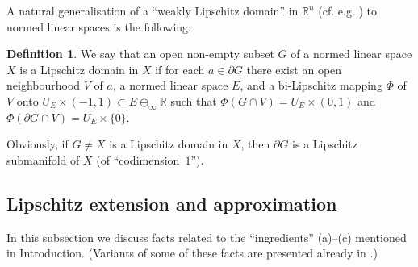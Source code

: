 \documentclass[a4paper,twoside,10pt,reqno,draft]{amsart}
\theoremstyle{definition}
\newtheorem{definition}[theorem]{Definition}
\theoremstyle{remark}
\newcommand\R{{\mathbb R}}
\newcommand\bdry{\partial}
\begin{document}
A natural generalisation of a ``weakly Lipschitz domain'' in $\R^n$ (cf. e.g. \cite{GMM}) to normed linear spaces is the following:
\begin{definition}\label{d:lip_domain}
We say that an open non-empty subset $G$ of a normed linear space $X$ is a Lipschitz domain in $X$ if for each $a\in\bdry G$ there exist an open neighbourhood $V$ of $a$, a normed linear space $E$,
and a bi-Lipschitz mapping $\Phi$ of $V$ onto $U_E\times(-1,1)\subset E\oplus_\infty\R$ such that $\Phi(G\cap V)=U_E\times(0,1)$ and $\Phi(\bdry G\cap V)=U_E\times\{0\}$.
\end{definition}

Obviously, if $G\neq X$ is a Lipschitz domain in $X$, then $\bdry G$ is a Lipschitz submanifold of $X$ (of ``codimension~$1$'').

\subsection{Lipschitz extension and approximation}

In this subsection we discuss facts related to the ``ingredients'' (a)--(c) mentioned in Introduction.
(Variants of some of these facts are presented already in \cite{JS2}.)
\end{document}
